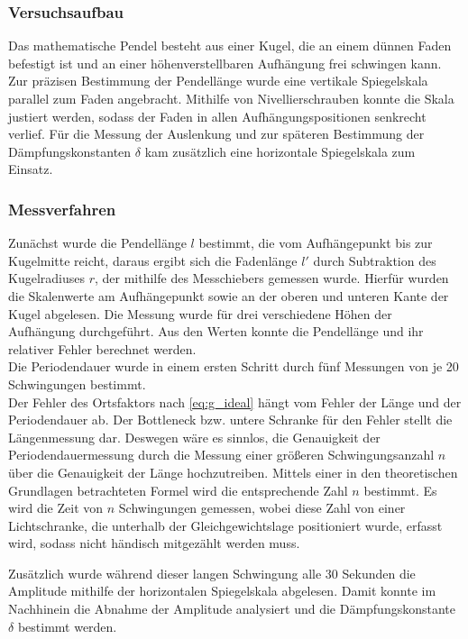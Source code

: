 \subsubsection{Versuchsaufbau}
Das mathematische Pendel besteht aus einer Kugel, die an einem dünnen Faden befestigt ist und an einer höhenverstellbaren Aufhängung frei schwingen kann. Zur präzisen Bestimmung der Pendellänge wurde eine vertikale Spiegelskala parallel zum Faden angebracht. Mithilfe von Nivellierschrauben konnte die Skala justiert werden, sodass der Faden in allen Aufhängungspositionen senkrecht verlief. Für die Messung der Auslenkung und zur späteren Bestimmung der Dämpfungskonstanten \(\delta\) kam zusätzlich eine horizontale Spiegelskala zum Einsatz. 

\subsubsection{Messverfahren}
Zunächst wurde die Pendellänge \(l\) bestimmt, die vom Aufhängepunkt bis zur Kugelmitte reicht, daraus ergibt sich die Fadenlänge \(l'\) durch Subtraktion des Kugelradiuses \(r\), der mithilfe des Messchiebers gemessen wurde. Hierfür wurden die Skalenwerte am Aufhängepunkt sowie an der oberen und unteren Kante der Kugel abgelesen. Die Messung wurde für drei verschiedene Höhen der Aufhängung durchgeführt. Aus den Werten konnte die Pendellänge und ihr relativer Fehler berechnet werden.\\
Die Periodendauer wurde in einem ersten Schritt durch fünf Messungen von je 20 Schwingungen bestimmt.\\
Der Fehler des Ortsfaktors nach \cref{eq:g_ideal} hängt vom Fehler der Länge und der Periodendauer ab. Der Bottleneck bzw. untere Schranke für den Fehler stellt die Längenmessung dar. Deswegen wäre es sinnlos, die Genauigkeit der Periodendauermessung durch die Messung einer größeren Schwingungsanzahl \(n\) über die Genauigkeit der Länge hochzutreiben. Mittels einer in den theoretischen Grundlagen betrachteten Formel wird die entsprechende Zahl \(n\) bestimmt. Es wird die Zeit von \(n\) Schwingungen gemessen, wobei diese Zahl von einer Lichtschranke, die unterhalb der Gleichgewichtslage positioniert wurde, erfasst wird, sodass nicht händisch mitgezählt werden muss.

Zusätzlich wurde während dieser langen Schwingung alle 30 Sekunden die Amplitude mithilfe der horizontalen Spiegelskala abgelesen. Damit konnte im Nachhinein die Abnahme der Amplitude analysiert und die Dämpfungskonstante \(\delta\) bestimmt werden.

